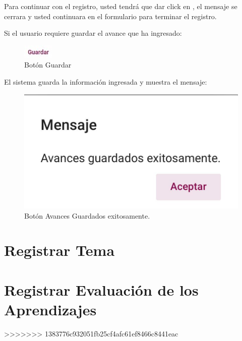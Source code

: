 Para continuar con el registro, usted tendrá que  dar click en , el mensaje se cerrara y usted continuara
en el formulario para terminar el registro.

\pagebreak
Si el usuario requiere guardar el avance que ha ingresado:

\begin{figure}[H]
    \centering
    \includegraphics[width=0.1\linewidth]{images/SP6/BotonGuardar.jpeg}
    \caption{Botón Guardar}
\end{figure}

El sistema guarda la información ingresada y muestra el mensaje:

\begin{figure}[H]
    \centering
    \includegraphics[width=0.4\linewidth]{images/SP6/BotonAvance.jpeg}
    \caption{Botón Avances Guardados exitosamente.}
\end{figure}


\pagebreak

\hypertarget{RegistrarTema}{\section{Registrar Tema}}
\pagebreak
\hypertarget{REA}{\section{Registrar Evaluación de los Aprendizajes}}
\pagebreak



>>>>>>> 1383776c932051fb25cf4afc61ef8466c8441eac
